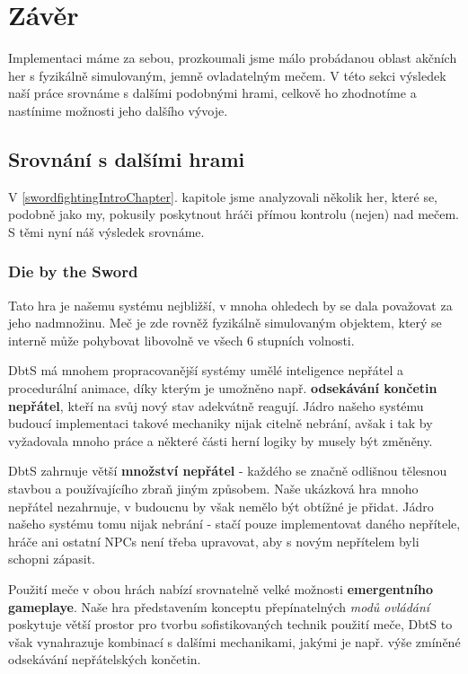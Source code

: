 \chapter{Závěr}

Implementaci máme za sebou, prozkoumali jsme málo probádanou oblast akčních her s fyzikálně simulovaným, jemně ovladatelným mečem. V této sekci výsledek naší práce srovnáme s dalšími podobnými hrami, celkově ho zhodnotíme a nastínime možnosti jeho dalšího vývoje. 

\section{Srovnání s dalšími hrami}

V \ref{swordfightingIntroChapter}. kapitole jsme analyzovali několik her, které se, podobně jako my, pokusily poskytnout hráči přímou kontrolu (nejen) nad mečem. S těmi nyní náš výsledek srovnáme.

\subsection{Die by the Sword}

Tato hra je našemu systému nejbližší, v mnoha ohledech by se dala považovat za jeho nadmnožinu. Meč je zde rovněž fyzikálně simulovaným objektem, který se interně může pohybovat libovolně ve všech 6 stupních volnosti. 

\acl{DbtS} má mnohem propracovanější systémy umělé inteligence nepřátel a procedurální animace, díky kterým je umožněno např. \textbf{odsekávání končetin nepřátel}, kteří na svůj nový stav adekvátně reagují. Jádro našeho systému budoucí implementaci takové mechaniky nijak citelně nebrání, avšak i tak by vyžadovala mnoho práce a některé části herní logiky by musely být změněny. 

\acl{DbtS} zahrnuje větší \textbf{množství nepřátel} - každého se značně odlišnou tělesnou stavbou a používajícího zbraň jiným způsobem. Naše ukázková hra mnoho nepřátel nezahrnuje, v budoucnu by však nemělo být obtížné je přidat. Jádro našeho systému tomu nijak nebrání - stačí pouze implementovat daného nepřítele, hráče ani ostatní \acs{NPC}s není třeba upravovat, aby s novým nepřítelem byli schopni zápasit.  

Použití meče v obou hrách nabízí srovnatelně velké možnosti \textbf{emergentního gameplaye}. Naše hra představením konceptu přepínatelných \textit{modů ovládání} poskytuje větší prostor pro tvorbu sofistikovaných technik použití meče, \acl{DbtS} to však vynahrazuje kombinací s dalšími mechanikami, jakými je např. výše zmíněné odsekávání nepřátelských končetin. 

